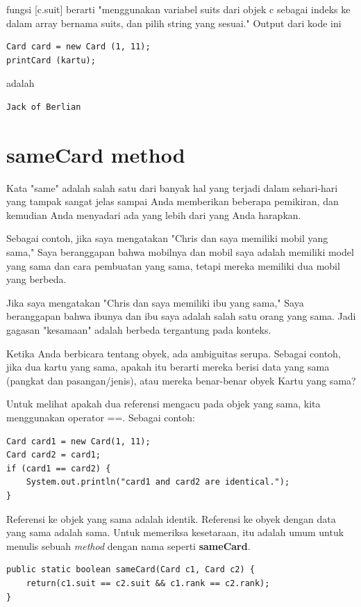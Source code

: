 \noindent fungsi [c.suit] berarti "menggunakan variabel suits dari objek c sebagai indeks ke dalam array bernama suits, dan pilih string yang sesuai." Output dari kode ini 
\begin{lstlisting}
Card card = new Card (1, 11); 
printCard (kartu);
\end{lstlisting}

\noindent adalah 
\begin{lstlisting} 
Jack of Berlian 
\end{lstlisting}

\section{sameCard method}
Kata "same" adalah salah satu dari banyak hal yang terjadi dalam sehari-hari yang tampak sangat jelas sampai Anda memberikan beberapa pemikiran, dan kemudian Anda menyadari ada yang lebih dari yang Anda harapkan.

\noindent Sebagai contoh, jika saya mengatakan "Chris dan saya memiliki mobil yang sama," Saya beranggapan bahwa mobilnya dan mobil saya adalah memiliki model yang sama dan cara pembuatan yang sama, tetapi mereka memiliki dua mobil yang berbeda. 

\noindent Jika saya mengatakan "Chris dan saya memiliki ibu yang sama," Saya beranggapan bahwa ibunya dan ibu saya adalah salah satu orang yang sama. Jadi gagasan "kesamaan" adalah berbeda tergantung pada konteks.

\noindent Ketika Anda berbicara tentang obyek, ada ambiguitas serupa. Sebagai contoh, jika dua kartu yang sama, apakah itu berarti mereka berisi data yang sama (pangkat dan pasangan/jenis), atau mereka benar-benar obyek Kartu yang sama?

\noindent Untuk melihat apakah dua referensi mengacu pada objek yang sama, kita menggunakan operator ==. Sebagai contoh:
\begin{lstlisting}
Card card1 = new Card(1, 11); 
Card card2 = card1;
if (card1 == card2) { 
    System.out.println("card1 and card2 are identical."); 
}
\end{lstlisting}

\noindent Referensi ke objek yang sama adalah identik. Referensi ke obyek dengan data yang sama adalah sama.
Untuk memeriksa kesetaraan, itu adalah umum untuk menulis sebuah \textit{method} dengan nama seperti \textbf{sameCard}.
\begin{lstlisting}
public static boolean sameCard(Card c1, Card c2) { 
    return(c1.suit == c2.suit && c1.rank == c2.rank); 
}
\end{lstlisting}

